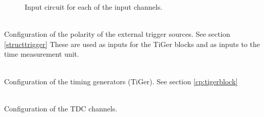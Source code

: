 	\begin{figure}
		\begin{center}
			\caption{Input circuit for each of the input channels. \label{fig:dcoffset1}}
		\end{center}
	\end{figure}

	\\
	Configuration of the polarity of the external trigger sources. See section \ref{structtrigger}
	These are used as inputs for the TiGer blocks and as inputs to the time measurement unit.\par

	\\
	Configuration of the timing generators (TiGer). See section \ref{cp:tigerblock}


	\\
		Configuration of the TDC channels.

